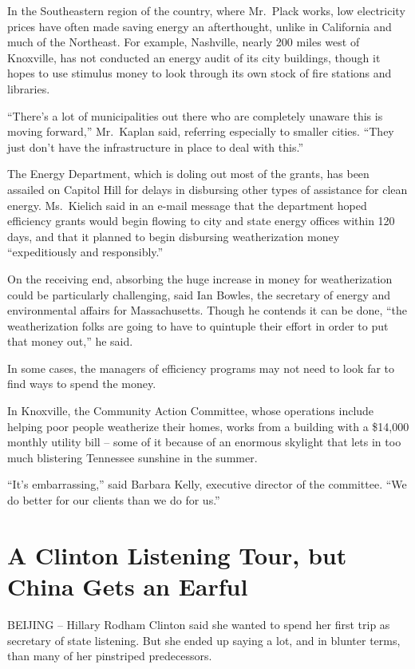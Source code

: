 \documentclass[12pt,a4paper,onecolumn]{article}
\begin{document}
\begin{CJK*}{GBK}{song}
In the Southeastern region of the country, where Mr.~Plack works, low electricity prices have often
made saving energy an afterthought, unlike in California and much of the Northeast. For example,
Nashville, nearly 200 miles west of Knoxville, has not conducted an energy audit of its city
buildings, though it hopes to use stimulus money to look through its own stock of fire stations and
libraries.

``There's a lot of municipalities out there who are completely unaware this is moving forward,''
Mr.~Kaplan said, referring especially to smaller cities. ``They just don't have the infrastructure
in place to deal with this.''

The Energy Department, which is doling out most of the grants, has been assailed on Capitol Hill for
delays in disbursing other types of assistance for clean energy. Ms.~Kielich said in an e-mail
message that the department hoped efficiency grants would begin flowing to city and state energy
offices within 120 days, and that it planned to begin disbursing weatherization money
``expeditiously and responsibly.''

On the receiving end, absorbing the huge increase in money for weatherization could be particularly
challenging, said Ian Bowles, the secretary of energy and environmental affairs for Massachusetts.
Though he contends it can be done, ``the weatherization folks are going to have to quintuple their
effort in order to put that money out,'' he said.

In some cases, the managers of efficiency programs may not need to look far to find ways to spend
the money.

In Knoxville, the Community Action Committee, whose operations include helping poor people
weatherize their homes, works from a building with a \$14,000 monthly utility bill -- some of it
because of an enormous skylight that lets in too much blistering Tennessee sunshine in the summer.

``It's embarrassing,'' said Barbara Kelly, executive director of the committee. ``We do better for
our clients than we do for us.''



\section{A Clinton Listening Tour, but China Gets an Earful}

BEIJING -- Hillary Rodham Clinton said she wanted to spend her first trip as secretary of state
listening. But she ended up saying a lot, and in blunter terms, than many of her pinstriped
predecessors.


\end{CJK*}
\end{document}
